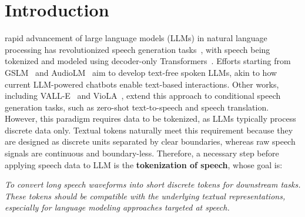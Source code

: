\section{Introduction}



 rapid advancement of large language models (LLMs) in natural language processing has revolutionized speech generation tasks~\cite{cui2024recent,ji2024wavchat}, with speech being tokenized and modeled using decoder-only Transformers~\cite{transformer}. 
Efforts starting from GSLM~\cite{lakhotia2021generative} and AudioLM~\cite{borsos2023audiolm} aim to develop text-free spoken LLMs, akin to how current LLM-powered chatbots enable text-based interactions. 
Other works, including VALL-E~\cite{valle} and VioLA~\cite{wang2024viola}, extend this approach to conditional speech generation tasks, such as zero-shot text-to-speech and speech translation.
However, this paradigm requires data to be tokenized, as LLMs typically process discrete data only. 
Textual tokens naturally meet this requirement because they are designed as discrete units separated by clear boundaries, whereas raw speech signals are continuous and boundary-less. 
Therefore, a necessary step before applying speech data to LLM is the \textbf{tokenization of speech}, whose goal is:

\begin{center}
    \textit{To convert long speech waveforms into short discrete tokens for downstream tasks. These tokens should be compatible with the underlying textual representations, especially for language modeling approaches targeted at speech.}
\end{center}

